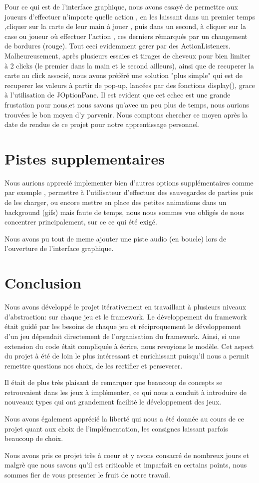 \documentclass[a4paper, 11pt, DIV=9]{scrartcl}
\begin{document}
Pour ce qui est de l'interface graphique, nous avons essayé de permettre aux joueurs d'effectuer n'importe quelle
action , en les laissant dans un premier temps ,cliquer sur la carte de leur main à jouer , puis dans un second,
à cliquer sur la case ou joueur où effectuer l'action , ces derniers rémarqués par un changement de bordures (rouge).
Tout ceci evidemment gerer par des ActionListeners.
Malheureusement, après plusieurs essaies et tirages de cheveux pour bien limiter à 2 clicks (le premier dans la main et le second ailleurs),
ainsi que de recuperer la carte au click associé, nous avons préféré une solution "plus simple" qui est de recuperer les valeurs à partir de pop-up, 
lancées par des fonctions display(), grace à l'utilisation de JOptionPane.
Il est evident que cet echec est une grande frustation pour nous,et nous savons qu'avec un peu plus de temps, nous aurions trouvées le bon moyen
d'y parvenir.
Nous comptons chercher ce moyen après la date de rendue de ce projet pour notre apprentissage personnel.


\section{Pistes supplementaires}
  Nous aurions apprecié implementer bien d'autres options supplémentaires comme par exemple ,
  permettre à l'utilisateur d'effectuer des sauvegardes de parties puis de les charger,
  ou encore mettre en place des petites animations dans un background (gifs)
  mais faute de temps, nous nous sommes vue obligés de nous concentrer principalement,
  sur ce ce qui été exigé.
 
  Nous avons pu tout de meme ajouter une piste audio (en boucle) lors de l'ouverture de l'interface graphique.
  
  
\section{Conclusion}

Nous avons développé le projet itérativement en travaillant à plusieurs niveaux
d'abstraction: sur chaque jeu et le framework. Le développement du framework
était guidé par les besoins de chaque jeu et réciproquement le développement
d'un jeu dépendait directement de l'organisation du framework. Ainsi, si une
extension du code était compliquée à écrire, nous revoyions le modèle. 
Cet aspect du projet à été de loin le plus intéressant et enrichissant puisqu'il
nous a permit remettre questions nos choix, de les rectifier et perseverer.

Il était de plus très plaisant de remarquer que beaucoup de concepts se
retrouvaient dans les jeux à implémenter, ce qui nous a conduit à introduire de
nouveaux types qui ont grandement facilité le développement des jeux.

Nous avons également apprécié la liberté qui nous a été donnée au cours de ce projet
quant aux choix de l'implémentation, les consignes laissant parfois beaucoup de choix.

Nous avons pris ce projet très à coeur et y avons consacré de nombreux jours et malgrè que 
nous savons qu'il est criticable et imparfait en certains points, nous sommes fier de 
vous presenter le fruit de notre travail.
\end{document}

